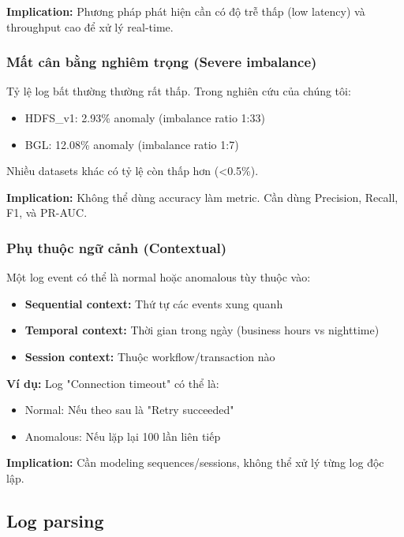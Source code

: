\textbf{Implication:} Phương pháp phát hiện cần có độ trễ thấp (low latency) và throughput cao để xử lý real-time.

\subsubsection{Mất cân bằng nghiêm trọng (Severe imbalance)}

Tỷ lệ log bất thường thường rất thấp. Trong nghiên cứu của chúng tôi:

\begin{itemize}
    \item HDFS\_v1: 2.93\% anomaly (imbalance ratio 1:33)
    \item BGL: 12.08\% anomaly (imbalance ratio 1:7)
\end{itemize}

Nhiều datasets khác có tỷ lệ còn thấp hơn (<0.5\%).

\textbf{Implication:} Không thể dùng accuracy làm metric. Cần dùng Precision, Recall, F1, và PR-AUC.

\subsubsection{Phụ thuộc ngữ cảnh (Contextual)}

Một log event có thể là normal hoặc anomalous tùy thuộc vào:

\begin{itemize}
    \item \textbf{Sequential context:} Thứ tự các events xung quanh
    \item \textbf{Temporal context:} Thời gian trong ngày (business hours vs nighttime)
    \item \textbf{Session context:} Thuộc workflow/transaction nào
\end{itemize}

\textbf{Ví dụ:} Log "Connection timeout" có thể là:
\begin{itemize}
    \item Normal: Nếu theo sau là "Retry succeeded"
    \item Anomalous: Nếu lặp lại 100 lần liên tiếp
\end{itemize}

\textbf{Implication:} Cần modeling sequences/sessions, không thể xử lý từng log độc lập.

\subsection{Log parsing}

